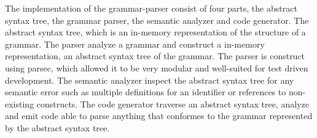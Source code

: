 The implementation of the grammar-parser consist of four parts, the abstract syntax tree, the grammar parser, the semantic analyzer and code generator.  
The abstract syntax tree, which is an in-memory representation of the structure of a grammar.  
 The parser analyze a grammar and construct a in-memory representation, an abstract syntax tree of the grammar.  The parser is construct using parsec, which allowed it to be very modular and well-suited for test driven development.  
The semantic analyzer inspect the abstract syntax tree for any semantic error such as multiple definitions for an identifier or references to non-existing constructs. The code generator traverse an abstract syntax tree, analyze and emit code able to parse anything that conformes to the grammar represented by the abstract syntax tree.
